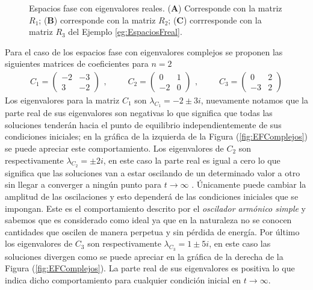 \begin{ejemplo}
\begin{figure}[h!]
		\caption{Espacios fase con eigenvalores reales. (\textbf{A}) Corresponde con la matriz $R_1$; (\textbf{B}) corresponde con la matriz $R_2$; (\textbf{C}) corrresponde con la matriz $R_3$ del Ejemplo \ref{eg:EspaciosFreal}.}
		\label{fig:EFReales}
	\end{figure}
\end{ejemplo}

\begin{ejemplo}\label{eg:EspaciosFcomplejos}
	Para el caso de los espacios fase con eigenvalores complejos se proponen las siguientes matrices de coeficientes para $n=2$
	\begin{equation*}
		\begin{split}
			C_1=\begin{pmatrix}
				-2 & -3\\
				3 & -2 
			\end{pmatrix}
		\end{split},\qquad
		\begin{split}
			C_2=\begin{pmatrix}
				0 & 1\\
				-2 & 0 			
			\end{pmatrix}
		\end{split},\qquad
		\begin{split}
			C_3=\begin{pmatrix}
				0 & 2\\
				-3 & 2
			\end{pmatrix}
		\end{split}
	\end{equation*}
	Los eigenvalores para la matriz $C_1$ son $\lambda_{C_1}=-2\pm 3i$, nuevamente notamos que la parte real de sus eigenvalores son negativas lo que significa que todas las soluciones tenderán hacia el punto de equilibrio independientemente de sus condiciones iniciales; en la gráfica de la izquierda de la Figura (\ref{fig:EFComplejos}) se puede apreciar este comportamiento. Los eigenvalores de $C_2$ son respectivamente $\lambda_{C_2}=\pm 2i$, en este caso la parte real es igual a cero lo que significa que las soluciones van a estar oscilando de un determinado valor a otro sin llegar a converger a ningún punto para $t\to\infty$ . Únicamente puede cambiar la amplitud de las oscilaciones y esto dependerá de las condiciones iniciales que se impongan. Este es el comportamiento descrito por el \textit{oscilador armónico simple} y sabemos que es considerado como ideal ya que en la naturaleza no se conocen cantidades que oscilen de manera perpetua y sin pérdida de energía. Por último los eigenvalores de $C_3$ son respectivamente $\lambda_{C_3}=1\pm 5i$, en este caso las soluciones divergen como se puede apreciar en la gráfica de la derecha de la Figura (\ref{fig:EFComplejos}). La parte real de sus eigenvalores es positiva lo que indica dicho comportamiento para cualquier condición inicial en $t\to\infty$.

\end{ejemplo}
